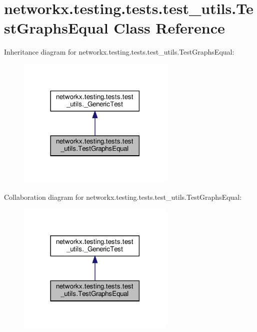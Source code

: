 \hypertarget{classnetworkx_1_1testing_1_1tests_1_1test__utils_1_1TestGraphsEqual}{}\section{networkx.\+testing.\+tests.\+test\+\_\+utils.\+Test\+Graphs\+Equal Class Reference}
\label{classnetworkx_1_1testing_1_1tests_1_1test__utils_1_1TestGraphsEqual}


Inheritance diagram for networkx.\+testing.\+tests.\+test\+\_\+utils.\+Test\+Graphs\+Equal\+:
\nopagebreak
\begin{figure}[H]
\begin{center}
\leavevmode
\includegraphics[width=213pt]{classnetworkx_1_1testing_1_1tests_1_1test__utils_1_1TestGraphsEqual__inherit__graph}
\end{center}
\end{figure}


Collaboration diagram for networkx.\+testing.\+tests.\+test\+\_\+utils.\+Test\+Graphs\+Equal\+:
\nopagebreak
\begin{figure}[H]
\begin{center}
\leavevmode
\includegraphics[width=213pt]{classnetworkx_1_1testing_1_1tests_1_1test__utils_1_1TestGraphsEqual__coll__graph}
\end{center}
\end{figure}
